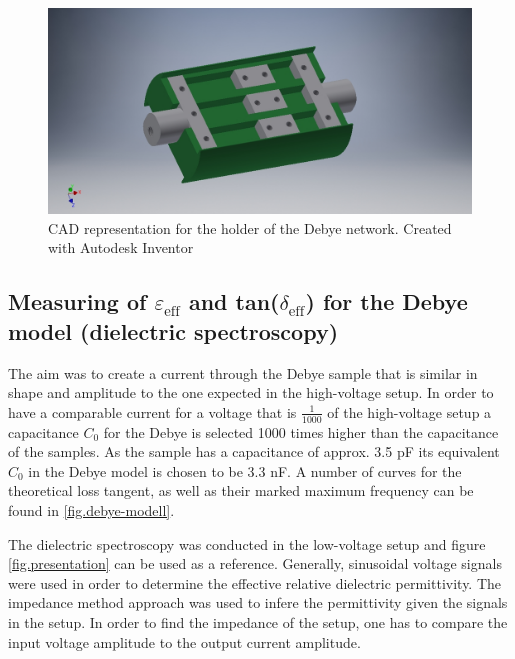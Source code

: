 \begin{figure}[h!tb]
\includegraphics[width=\textwidth]{figures/Method/CAD_MODEL/Gesamtanordnung.jpg}
\caption{CAD representation for the holder of the Debye network. Created with Autodesk Inventor}
\label{fig.CADgraph}
\end{figure}




    

\subsection{Measuring of $\varepsilon_{\textrm{eff}}$ and tan($\delta_{\textrm{eff}}$) for the Debye model (dielectric spectroscopy)}
\label{spectroscopy}
The aim was to create a current through the Debye sample that is similar in shape and amplitude to the one expected in the high-voltage setup. In order to have a comparable current for a voltage that is $\frac{1}{1000}$ of the high-voltage setup a capacitance $C_0$ for the Debye is selected 1000 times higher than the capacitance of the samples. As the sample has a capacitance of approx. 3.5 pF its equivalent $C_0$ in the Debye model is chosen to be 3.3 nF.
A number of curves for the theoretical loss tangent, as well as their marked maximum frequency can be found in \ref{fig.debye-modell}.

The dielectric spectroscopy was conducted in the low-voltage setup and figure \ref{fig.presentation} can be used as a reference.
Generally, sinusoidal voltage signals were used in order to determine the effective relative dielectric permittivity.
The impedance method \cite{Kramer} approach was used to infere the permittivity given the signals in the setup.
In order to find the impedance of the setup, one has to compare the input voltage amplitude to the output current amplitude.

